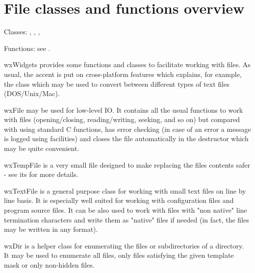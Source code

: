 \section{File classes and functions overview}\label{wxfileoverview}

Classes: , , , 

Functions: see .

wxWidgets provides some functions and classes to facilitate working with files.
As usual, the accent is put on cross-platform features which explains, for
example, the  class which may be used to convert
between different types of text files (DOS/Unix/Mac).

wxFile may be used for low-level IO. It contains all the usual functions to work
with files (opening/closing, reading/writing, seeking, and so on) but compared with
using standard C functions, has error checking (in case of an error a message
is logged using  facilities) and closes the file
automatically in the destructor which may be quite convenient.

wxTempFile is a very small file designed to make replacing the files contents
safer - see its  for more details.

wxTextFile is a general purpose class for working with small text files on line
by line basis. It is especially well suited for working with configuration files
and program source files. It can be also used to work with files with "non
native" line termination characters and write them as "native" files if needed
(in fact, the files may be written in any format).

wxDir is a helper class for enumerating the files or subdirectories of a
directory. It may be used to enumerate all files, only files satisfying the
given template mask or only non-hidden files.

